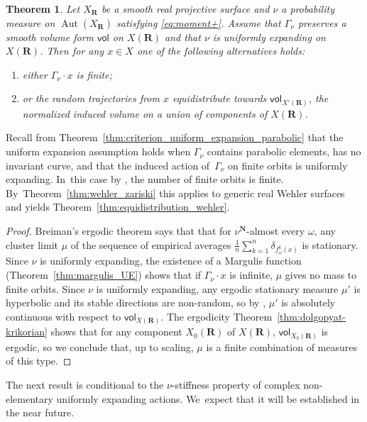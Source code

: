 \documentclass[11pt]{article}
\newenvironment{enumeratea}
{\bgroup\def\theenumi{\alph{enumi}}\begin{enumerate}}
{\end{enumerate}\egroup}
\newcommand{\unsur}[1]{\frac{1}{#1}}
\DeclareMathOperator{\aut}{Aut}
\def\R{\mathbf{R}}
\def\N{\mathbf{N}}
\newcommand{\vol}{{\mathsf{vol}}}
\theoremstyle{plain}
\newtheorem{thm}{Theorem}[section]
\theoremstyle{definition}
\numberwithin{equation}{section}
\begin{document}
\begin{thm}
Let $X_\R$ be a smooth
real projective surface and $\nu$ a probability measure on $\aut(X_\R)$ satisfying \eqref{eq:moment+}.
Assume that $\Gamma_\nu$ preserves a smooth volume form $\vol$ on $X(\R)$ and that $\nu$ is uniformly
expanding on $X(\R)$. Then for any $x\in X$ one of the following alternatives holds:
\begin{enumeratea}
\item either $\Gamma_\nu\cdot x$ is finite;
\item or the random trajectories from $x$ equidistribute
towards $\vol_{X'(\R)}$, the normalized induced volume on a
union of components of $X(\R)$.
\end{enumeratea}
\end{thm}

Recall from Theorem~\ref{thm:criterion_uniform_expansion_parabolic} that the uniform expansion assumption
holds when $\Gamma_\nu$
contains parabolic elements, has no invariant curve, and that the induced
action of~$\Gamma_\nu$ on finite orbits is uniformly expanding. In~this case by \cite[Th.\,C]{finite_orbits},
the number of finite orbits is finite. By~Theorem~\ref{thm:wehler_zariski} this applies to generic real Wehler
surfaces and yields Theorem~\ref{thm:equidistribution_wehler}.

\begin{proof}
Breiman's ergodic theorem says that that for $\nu^\N$-almost every $\omega$, any cluster limit $\mu$
of the sequence of empirical averages $\unsur{n} \sum_{k=1}^n \delta_{f_\omega^k(x)}$ is stationary.
Since $\nu$ is uniformly expanding, the existence of a Margulis function (Theorem~\ref{thm:margulis_UE}) shows that if $\Gamma_\nu\cdot x$ is infinite, $\mu$ gives no mass to finite orbits.
Since $\nu$ is uniformly expanding, any ergodic stationary measure $\mu'$ is hyperbolic and its stable directions are non-random, so by \cite[Th.\,3.4]{br}, $\mu'$ is absolutely continuous with respect to $\vol_{X(\R)}$. The ergodicity
Theorem~\ref{thm:dolgopyat-krikorian} shows that for any component $X_0(\R)$ of $X(\R)$, $\vol_{X_0(\R)}$ is ergodic, so
we conclude that, up to scaling, $\mu$ is a finite combination of measures of this type.
\end{proof}

The next result is conditional to the $\nu$-stiffness property of
complex non-elementary uniformly expanding actions. We~expect that
it will be established in the near future.
\end{document}
